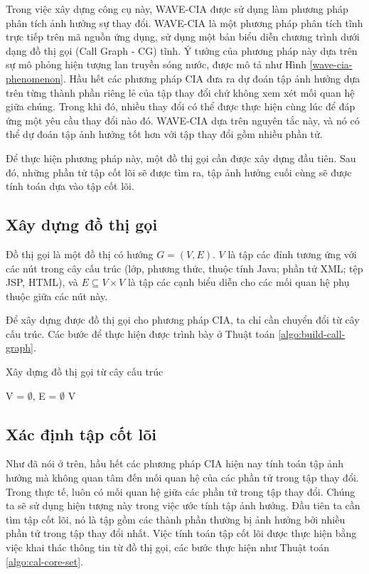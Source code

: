 \documentclass[12pt]{report}
\newenvironment{thuattoan}[1][h]
  {\renewcommand{\algorithmcfname}{Thuật toán}
   \begin{algorithm}[#1]
  }{\end{algorithm}}
\begin{document}
Trong việc xây dựng công cụ này, WAVE-CIA được sử dụng làm phương pháp phân tích ảnh hưởng sự thay đổi. WAVE-CIA là một phương pháp phân tích tĩnh trực tiếp trên mã nguồn ứng dụng, sử dụng một bản biểu diễn chương trình dưới dạng đồ thị gọi (Call Graph - CG) tĩnh. Ý tưởng của phương pháp này dựa trên sự mô phỏng hiện tượng lan truyền sóng nước, được mô tả như Hình \ref{wave-cia-phenomenon}. Hầu hết các phương pháp CIA đưa ra dự đoán tập ảnh hưởng dựa trên từng thành phần riêng lẻ của tập thay đổi chứ không xem xét mối quan hệ giữa chúng. Trong khi đó, nhiều thay đổi có thể được thực hiện cùng lúc để đáp ứng một yêu cầu thay đổi nào đó. WAVE-CIA dựa trên nguyên tắc này, và nó có thể dự đoán tập ảnh hưởng tốt hơn với tập thay đổi gồm nhiều phần tử.

Để thực hiện phương pháp này, một đồ thị gọi cần được xây dựng đầu tiên. Sau đó, những phần tử tập cốt lõi sẽ được tìm ra, tập ảnh hưởng cuối cùng sẽ được tính toán dựa vào tập cốt lõi.

\subsection{Xây dựng đồ thị gọi}
Đồ thị gọi là một đồ thị có hướng $G = (V, E)$. $V$ là tập các đỉnh tương ứng với các nút trong cây cấu trúc (lớp, phương thức, thuộc tính Java; phần tử XML; tệp JSP, HTML), và $E \subseteq V \times V$ là tập các cạnh biểu diễn cho các mối quan hệ phụ thuộc giữa các nút này.

Để xây dựng được đồ thị gọi cho phương pháp CIA, ta chỉ cần chuyển đổi từ cây cấu trúc. Các bước để thực hiện được trình bày ở Thuật toán \ref{algo:build-call-graph}.

\begin{thuattoan}
	\label{algo:build-call-graph}
	\caption{Xây dựng đồ thị gọi từ cây cấu trúc}
	V = $\emptyset$, E = $\emptyset$\;
	\Return V\;
\end{thuattoan}

\subsection{Xác định tập cốt lõi}
Như đã nói ở trên, hầu hết các phương pháp CIA hiện nay tính toán tập ảnh hưởng mà không quan tâm đến mối quan hệ của các phần tử trong tập thay đổi. Trong thực tế, luôn có mối quan hệ giữa các phần tử trong tập thay đổi. Chúng ta sẽ sử dụng hiện tượng này trong việc ước tính tập ảnh hưởng. Đầu tiên ta cần tìm tập cốt lõi, nó là tập gồm các thành phần thường bị ảnh hưởng bởi nhiều phần tử trong tập thay đổi nhất. Việc tính toán tập cốt lõi được thực hiện bằng việc khai thác thông tin từ đồ thị gọi, các bước thực hiện như Thuật toán \ref{algo:cal-core-set}.
\end{document}
